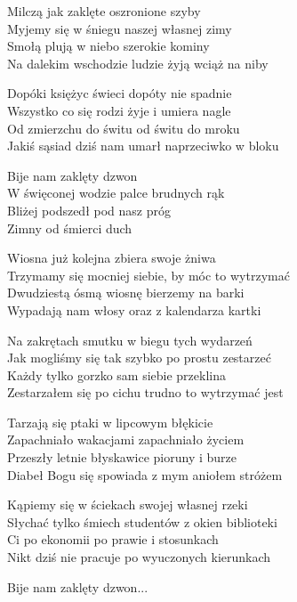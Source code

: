 \begin{text}
    Milczą jak zaklęte oszronione szyby\\
    Myjemy się w śniegu naszej własnej zimy\\
    Smołą plują w niebo szerokie kominy\\
    Na dalekim wschodzie ludzie żyją wciąż na niby

    Dopóki księżyc świeci dopóty nie spadnie\\
    Wszystko co się rodzi żyje i umiera nagle\\
    Od zmierzchu do świtu od świtu do mroku\\
    Jakiś sąsiad dziś nam umarł naprzeciwko w bloku

    \vin Bije nam zaklęty dzwon\\
    \vin W święconej wodzie palce brudnych rąk\\
    \vin Bliżej podszedł pod nasz próg\\
    \vin Zimny od śmierci duch

    Wiosna już kolejna zbiera swoje żniwa\\
    Trzymamy się mocniej siebie, by móc to wytrzymać\\
    Dwudziestą ósmą wiosnę bierzemy na barki\\
    Wypadają nam włosy oraz z kalendarza kartki

    Na zakrętach smutku w biegu tych wydarzeń\\
    Jak mogliśmy się tak szybko po prostu zestarzeć\\
    Każdy tylko gorzko sam siebie przeklina\\
    Zestarzałem się po cichu trudno to wytrzymać jest

    Tarzają się ptaki w lipcowym błękicie\\
    Zapachniało wakacjami zapachniało życiem\\
    Przeszły letnie błyskawice pioruny i burze\\
    Diabeł Bogu się spowiada z mym aniołem stróżem

    Kąpiemy się w ściekach swojej własnej rzeki\\
    Słychać tylko śmiech studentów z okien biblioteki\\
    Ci po ekonomii po prawie i stosunkach\\
    Nikt dziś nie pracuje po wyuczonych kierunkach

    \vin Bije nam zaklęty dzwon...


\end{text}
